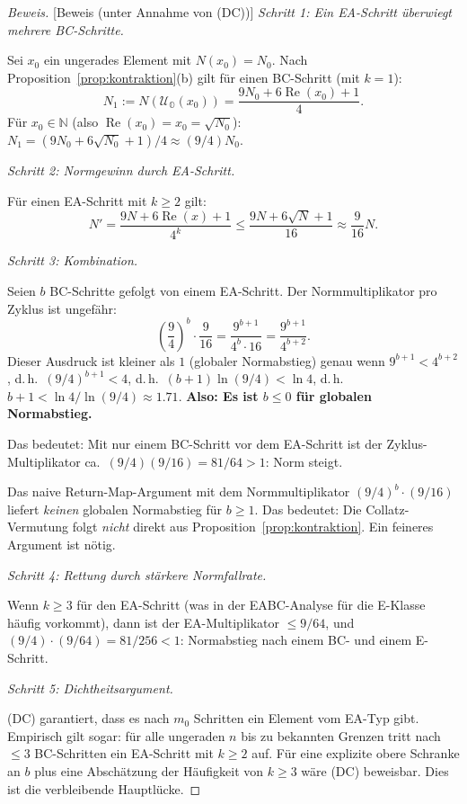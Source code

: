 \documentclass[12pt,a4paper]{article}
\newenvironment{beweis}{\begin{proof}[Beweis]}{\end{proof}}
\newcommand{\Norm}[1]{N(#1)}       %
\renewcommand{\Re}{\operatorname{Re}}
\newcommand{\N}{\mathbb{N}}
\newcommand{\Uo}{\mathcal{U}_{\mathbb{O}}} %
\begin{document}
\begin{beweis}[Beweis (unter Annahme von (DC))]
\textit{Schritt 1: Ein EA-Schritt überwiegt mehrere BC-Schritte.}

Sei $x_0$ ein ungerades Element mit $\Norm{x_0} = N_0$.
Nach Proposition~\ref{prop:kontraktion}(b) gilt für einen BC-Schritt
(mit $k=1$):
\[
  N_1 := \Norm{\Uo(x_0)} = \frac{9N_0 + 6\Re(x_0) + 1}{4}.
\]
Für $x_0 \in \N$ (also $\Re(x_0) = x_0 = \sqrt{N_0}$):
$N_1 = (9N_0 + 6\sqrt{N_0} + 1)/4 \approx (9/4) N_0$.

\textit{Schritt 2: Normgewinn durch EA-Schritt.}

Für einen EA-Schritt mit $k \geq 2$ gilt:
\[
  N' = \frac{9N + 6\Re(x) + 1}{4^k} \leq \frac{9N + 6\sqrt{N} + 1}{16}
       \approx \frac{9}{16} N.
\]

\textit{Schritt 3: Kombination.}

Seien $b$ BC-Schritte gefolgt von einem EA-Schritt. Der Normmultiplikator
pro Zyklus ist ungefähr:
\[
  \left(\frac{9}{4}\right)^b \cdot \frac{9}{16} = \frac{9^{b+1}}{4^b \cdot 16} = \frac{9^{b+1}}{4^{b+2}}.
\]
Dieser Ausdruck ist kleiner als $1$ (globaler Normabstieg) genau wenn
$9^{b+1} < 4^{b+2}$, d.\,h.\ $(9/4)^{b+1} < 4$, d.\,h.\
$(b+1) \ln(9/4) < \ln 4$, d.\,h.\ $b+1 < \ln 4/\ln(9/4) \approx 1.71$.
\textbf{Also: Es ist $b \leq 0$ für globalen Normabstieg.}

Das bedeutet: Mit nur einem BC-Schritt vor dem EA-Schritt ist der
Zyklus-Multiplikator ca.\ $(9/4)(9/16) = 81/64 > 1$: Norm steigt.

\begin{tcolorbox}[warnung, title={Kritischer Befund}]
Das naive Return-Map-Argument mit dem Normmultiplikator $(9/4)^b \cdot (9/16)$
liefert \emph{keinen} globalen Normabstieg für $b \geq 1$.
Das bedeutet: Die Collatz-Vermutung folgt \emph{nicht} direkt aus
Proposition~\ref{prop:kontraktion}. Ein feineres Argument ist nötig.
\end{tcolorbox}

\textit{Schritt 4: Rettung durch stärkere Normfallrate.}

Wenn $k \geq 3$ für den EA-Schritt (was in der EABC-Analyse für die
E-Klasse häufig vorkommt), dann ist der EA-Multiplikator $\leq 9/64$,
und $(9/4) \cdot (9/64) = 81/256 < 1$: Normabstieg nach einem BC-
und einem E-Schritt.

\textit{Schritt 5: Dichtheitsargument.}

(DC) garantiert, dass es nach $m_0$ Schritten ein Element vom EA-Typ gibt.
Empirisch gilt sogar: für alle ungeraden $n$ bis zu bekannten Grenzen
tritt nach $\leq 3$ BC-Schritten ein EA-Schritt mit $k \geq 2$ auf.
Für eine explizite obere Schranke an $b$ plus eine Abschätzung der
Häufigkeit von $k \geq 3$ wäre (DC) beweisbar. Dies ist die
verbleibende Hauptlücke.
\end{beweis}
\end{document}
